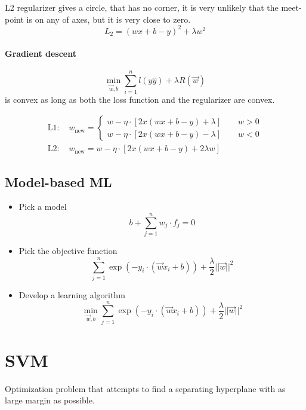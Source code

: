 \documentclass[a4paper,6pt,twocolumn,fleqn]{article}
\begin{document}
L2 regularizer gives a circle, that has no corner, it is very unlikely that the meet-point is on any of axes, but it is very close to zero.
\begin{equation}
    L_2 = (wx+b-y)^2 + \lambda w^2
\end{equation}
\paragraph{Gradient descent} 
\begin{equation}
    \min_{\vec w,b} \sum_{i=1}^n l(y \hat y) + \lambda R(\vec w)
\end{equation}
is convex as long as both the loss function and the regularizer are convex.

\begin{align}
    \text{L1: } & w_\text{new} = \begin{cases}
        w - \eta \cdot [2x (wx + b - y) + \lambda] \qquad w > 0\\
        w - \eta \cdot [2x (wx + b - y) - \lambda] \qquad w < 0
    \end{cases}\\
    \text{L2: } & w_\text{new} = w - \eta \cdot [2x (wx + b - y) + 2\lambda w]
\end{align}
\subsection{Model-based ML} %
\begin{itemize}
    \item Pick a model
    \begin{equation}
        b + \sum_{j=1}^n w_j \cdot f_j = 0
    \end{equation}
    \item Pick the objective function 
    \begin{equation}
        \sum_{j=1}^n \exp (-y_i \cdot (\vec w x_i + b)) + \frac \lambda 2 ||\vec w||^2
    \end{equation}
    \item Develop a learning algorithm
    \begin{equation}
        \min_{\vec w,b} \sum_{j=1}^n \exp (-y_i \cdot (\vec w x_i + b)) + \frac \lambda 2 ||\vec w||^2
    \end{equation}
\end{itemize}
\section{SVM}
Optimization problem that attempts to find a separating hyperplane with as large margin as possible.
\end{document}
